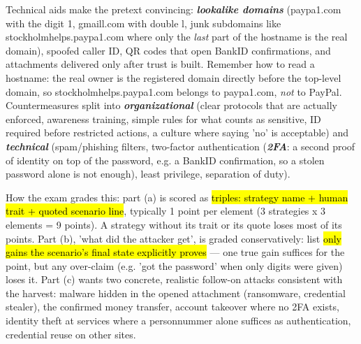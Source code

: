 \documentclass[12pt, a4paper]{article}
\newcommand{\term}[1]{\textbf{\textit{#1}}}        %
\newcommand{\imp}[1]{\hl{#1}}                       %
\begin{document}
Technical aids make the pretext convincing: \term{lookalike domains} (paypa1.com with the digit 1, gmaill.com with double l, junk subdomains like stockholmhelps.paypa1.com where only the \emph{last} part of the hostname is the real domain), spoofed caller ID, QR codes that open BankID confirmations, and attachments delivered only after trust is built. Remember how to read a hostname: the real owner is the registered domain directly before the top-level domain, so stockholmhelps.paypa1.com belongs to paypa1.com, \emph{not} to PayPal. Countermeasures split into \term{organizational} (clear protocols that are actually enforced, awareness training, simple rules for what counts as sensitive, ID required before restricted actions, a culture where saying 'no' is acceptable) and \term{technical} (spam/phishing filters, two-factor authentication (\term{2FA}: a second proof of identity on top of the password, e.g. a BankID confirmation, so a stolen password alone is not enough), least privilege, separation of duty).

How the exam grades this: part (a) is scored as \imp{triples: strategy name + human trait + quoted scenario line}, typically 1 point per element (3 strategies x 3 elements = 9 points). A strategy without its trait or its quote loses most of its points. Part (b), 'what did the attacker get', is graded conservatively: list \imp{only gains the scenario's final state explicitly proves} --- one true gain suffices for the point, but any over-claim (e.g. 'got the password' when only digits were given) loses it. Part (c) wants two concrete, realistic follow-on attacks consistent with the harvest: malware hidden in the opened attachment (ransomware, credential stealer), the confirmed money transfer, account takeover where no 2FA exists, identity theft at services where a personnummer alone suffices as authentication, credential reuse on other sites.
\end{document}
